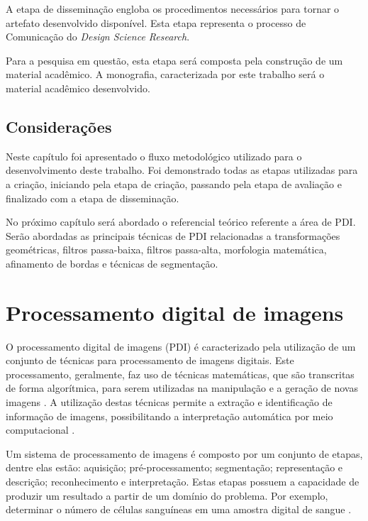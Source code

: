 \documentclass[
	12pt,				%
	oneside,			%
	a4paper,			%
	english,			%
	french,				%
	spanish,			%
	brazil,				%
	]{abntex2}
\begin{document}
A etapa de disseminação engloba os procedimentos necessários para tornar o artefato desenvolvido disponível. Esta etapa representa o processo de Comunicação do  \textit{Design Science Research}.

Para a pesquisa em questão, esta etapa será composta pela construção de um material acadêmico. A monografia, caracterizada por este trabalho será o material acadêmico desenvolvido.


\section{Considerações}

Neste capítulo foi apresentado o fluxo metodológico utilizado para o desenvolvimento deste trabalho. Foi demonstrado todas as etapas utilizadas para a criação, iniciando pela etapa de criação, passando pela etapa de avaliação e finalizado com a etapa de disseminação. 

No próximo capítulo será abordado o referencial teórico referente a área de PDI. Serão abordadas as principais técnicas de PDI relacionadas a transformações geométricas, filtros passa-baixa, filtros passa-alta, morfologia matemática, afinamento de bordas e técnicas de segmentação.


\chapter{Processamento digital de imagens}
\label{sec:pdi}

O  processamento digital de imagens (PDI) é caracterizado pela utilização de um conjunto de técnicas para processamento de imagens digitais. Este processamento, geralmente, faz uso de técnicas matemáticas, que são transcritas de forma algorítmica, para serem utilizadas na manipulação e a geração de novas imagens \cite{gonzalesWoods:2008}. A utilização destas técnicas permite a extração e identificação de informação de imagens, possibilitando a interpretação automática por meio computacional \cite{pedriniSchwartz:2008}.

Um sistema de processamento de imagens é composto por um conjunto de etapas, dentre elas estão: aquisição; pré-processamento; segmentação; representação e descrição; reconhecimento e interpretação. Estas etapas possuem a capacidade de produzir um resultado a partir de um domínio do problema. Por exemplo, determinar o número de células sanguíneas em uma amostra digital de sangue \cite{pedriniSchwartz:2008}.
\end{document}
